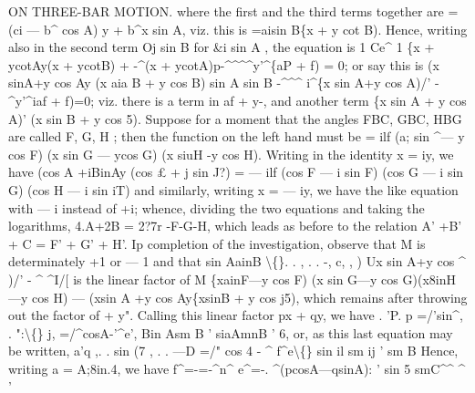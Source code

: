 \documentclass[11pt,a4paper]{book}
\begin{document}
ON THREE-BAR MOTION.
where
the
first
and
the
third
terms
together
are = (ci --- b\textasciicircum{} cos A) y + b\textasciicircum{}x sin A,
viz.
this
is
=aisin B\{x + y cot B).
Hence,
writing
also
in
the
second
term
Oj sin B
for
\&i sin A
,
the equation
is
1
Ce\textasciicircum{}
1
\{x + ycotAy(x + ycotB) + -\textasciicircum{}(x + ycotA)p-\textasciicircum{}\textasciicircum{}\textasciicircum{}\textasciicircum{}y'\textasciicircum{}\{aP + f) = 0;
or say this
is
(x sinA+y cos Ay (x aia B + y cos B)
sin A sin B
-\textasciicircum{}\textasciicircum{}\textasciicircum{}
i\textasciicircum{}\{x sin A+y cos A)/' -\textasciicircum{}y'\textasciicircum{}iaf + f)=0;
viz. there
is a term
in
af + y-, and another term
\{x sin A + y cos A)' (x sin B + y cos 5).
Suppose
for
a moment
that
the angles FBC, GBC, HBG are
called
F,
G, H
;
then
the function on
the
left hand must be
= ilf (a; sin \textasciicircum{}--- y cos F) (x sin G --- ycos G) (x siuH -y cos H).
Writing
in
the identity x = iy, we have
(cos A +iBinAy (cos \pounds{} + j sin J?) = --- ilf (cos F --- i sin F) (cos G --- i sin G) (cos H --- i sin iT)
and
similarly,
writing
x = --- iy,
we
have
the
like
equation
with --- i
instead
of +i;
whence, dividing the two equations and taking the
logarithms,
4.A+2B = 2?\guillemotleft{}7r -F-G-H,
which
leads as before
to the
relation A' +B' + C = F' + G' + H'.
Ip
completion
of
the
investigation,
observe
that M
is
determinately +1
or --- 1
and that
sin AainB \textbackslash\{\}.
.
,
.
.
-,
c,
,
)
Ux sin A+y cos \textasciicircum{} )/' - \textasciicircum{} \textasciicircum{}I/[
is the
linear factor of
M \{xainF---y cos F) (x sin G---y cos G)(x8inH---y cos H)
--- (xsin A +y cos Ay\{xsinB + y cos j5),
which
remains after throwing
out
the
factor
of + y".
Calling
this
linear
factor px + qy,
we have
.
\textdegree{}'P.
p =/'sin\textasciicircum{},
.
":\textbackslash\{\}
j, =/\textasciicircum{}cosA-'\textasciicircum{}e',
Bin Asm B
\textbullet{}'
siaAmnB
\textbullet{}'
6,
or, as
this
last equation may be
written,
a'q
,.
.
sin (7
,
.
. ---D =/" cos 4 - \textasciicircum{} f\textasciicircum{}e\textbackslash\{\}
sin il sm ij
\textbullet{}'
sm B
Hence, writing a = A;8in.4, we have
f\textasciicircum{}=-=-\textasciicircum{}n\textasciicircum{}
e\textasciicircum{}=-.
\textasciicircum{}(pcosA---qsinA):
\textbullet{}'
sin 5
smC\textasciicircum{}\textasciicircum{}
\textasciicircum{}
'
\end{document}
